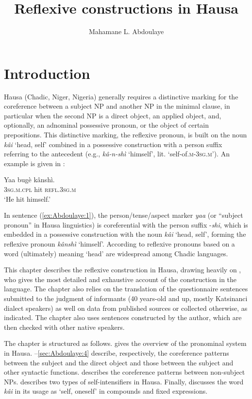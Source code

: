 \documentclass[output=paper]{langscibook}
\author{Mahamane L. Abdoulaye\affiliation{Université Abdou Moumouni, Niamey}}
\title{Reflexive constructions in Hausa}
\begin{document}
\maketitle

\section{Introduction}\label{sec:Abdoulaye:1}

Hausa (Chadic, Niger, Nigeria) generally requires a distinctive marking for the coreference between a subject NP and another NP in the minimal clause, in particular when the second NP is a direct object, an applied object, and, optionally, an adnominal possessive pronoun, or the object of certain prepositions. This distinctive marking, the reflexive pronoun, is built on the noun \textit{kâi} ‘head, self’ combined in a possessive construction with a person suffix referring to the antecedent (e.g., \textit{kâ-n-shì} ‘himself’, lit. ‘self-of.\textsc{m-3sg.m}’). An example is given in :


\ea%
    \label{ex:Abdoulaye:1}
    \gll Yaa  bugè  kânshì.\\
        \textsc{3sg.m.cpl} hit \textsc{refl.3sg.m}\\
    \glt `He hit himself.’
  \z


In sentence (\ref{ex:Abdoulaye:1}), the person/tense/aspect marker \textit{yaa} (or ``subject pronoun” in Hausa linguistics) is coreferential with the person suffix \nobreakdash-\textit{shi}, which is embedded in a possessive construction with the noun \textit{kâi} `head, self’, forming the reflexive pronoun \textit{kânshì} `himself’. According to 
\citet[529]{Newman2000} reflexive pronouns based on a word (ultimately) meaning `head’ are widespread among Chadic languages.



This chapter describes the reflexive construction in Hausa, drawing heavily on \citet{Newman2000}, who gives the most detailed and exhaustive account of the construction in the language. The chapter also relies on the translation of the questionnaire sentences submitted to the judgment of informants (40 years-old and up, mostly Katsinanci dialect speakers) as well on data from published sources or collected otherwise, as indicated. The chapter also uses sentences constructed by the author, which are then checked with other native speakers.

The chapter is structured as follows.  gives the overview of the pronominal system in Hausa. --\ref{sec:Abdoulaye:4} describe, respectively, the coreference patterns between the subject and the direct object and those between the subject and other syntactic functions.  describes the coreference patterns between non-subject NPs.  describes two types of self-intensifiers in Hausa. Finally,  discusses the word \textit{kâi} in its usage as ‘self, oneself’ in compounds and fixed expressions.
\end{document}
